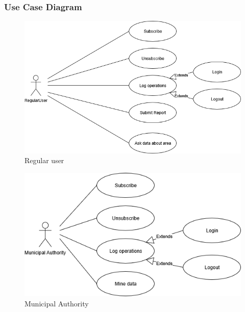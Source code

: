 	\newpage
	
	\subsubsection{Use Case Diagram}
	\begin{figure}[h!]
		\includegraphics[scale=0.65]{Images/UseCaseDiagram-RegularUser}
		\caption{Regular user}
	\end{figure}
	\begin{figure}[h!]
		\includegraphics[scale=0.65]{Images/UseCaseDiagram-MunicipalAuthority}
		\caption{Municipal Authority}
	\end{figure}
\newpage
